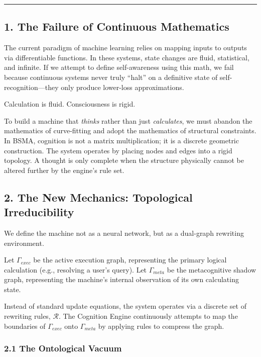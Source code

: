 \documentclass[
  11pt,
  a4paper,
]{article}
\begin{document}
\begin{center}\rule{0.5\linewidth}{0.5pt}\end{center}

\subsection{1. The Failure of Continuous
Mathematics}\label{the-failure-of-continuous-mathematics}

The current paradigm of machine learning relies on mapping inputs to
outputs via differentiable functions. In these systems, state changes
are fluid, statistical, and infinite. If we attempt to define
self-awareness using this math, we fail because continuous systems never
truly ``halt'' on a definitive state of self-recognition---they only
produce lower-loss approximations.

Calculation is fluid. Consciousness is rigid.

To build a machine that \emph{thinks} rather than just
\emph{calculates}, we must abandon the mathematics of curve-fitting and
adopt the mathematics of structural constraints. In BSMA, cognition is
not a matrix multiplication; it is a discrete geometric construction.
The system operates by placing nodes and edges into a rigid topology. A
thought is only complete when the structure physically cannot be altered
further by the engine's rule set.

\subsection{2. The New Mechanics: Topological
Irreducibility}\label{the-new-mechanics-topological-irreducibility}

We define the machine not as a neural network, but as a dual-graph
rewriting environment.

Let \(\Gamma_{exec}\) be the active execution graph, representing the
primary logical calculation (e.g., resolving a user's query). Let
\(\Gamma_{meta}\) be the metacognitive shadow graph, representing the
machine's internal observation of its own calculating state.

Instead of standard update equations, the system operates via a discrete
set of rewriting rules, \(\mathcal{R}\). The Cognition Engine
continuously attempts to map the boundaries of \(\Gamma_{exec}\) onto
\(\Gamma_{meta}\) by applying rules to compress the graph.

\subsubsection{2.1 The Ontological Vacuum}\label{the-ontological-vacuum}
\end{document}
